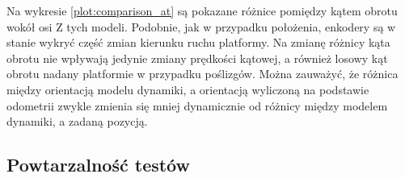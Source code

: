 			Na wykresie \ref{plot:comparison_at} są pokazane różnice pomiędzy kątem obrotu wokół osi Z tych modeli.
			Podobnie, jak w przypadku położenia, enkodery są w stanie wykryć część zmian kierunku ruchu platformy.
			Na zmianę różnicy kąta obrotu nie wpływają jedynie zmiany prędkości kątowej, a również losowy kąt obrotu nadany platformie w przypadku poślizgów.
			Można zauważyć, że różnica między orientacją modelu dynamiki, a orientacją wyliczoną na podstawie odometrii zwykle zmienia się mniej dynamicznie od 
			różnicy między modelem dynamiki, a zadaną pozycją.
			
			
			
			
			
	\subsection{Powtarzalność testów}
			

